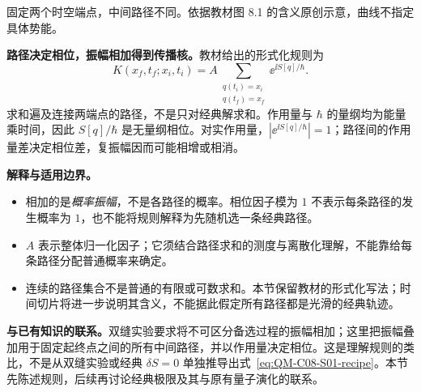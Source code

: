 \begin{center}
\begin{minipage}{\linewidth}
\centering
{}

\small 固定两个时空端点，中间路径不同。依据教材图 8.1 的含义原创示意，曲线不指定具体势能。
\end{minipage}
\end{center}

\textbf{路径决定相位，振幅相加得到传播核。}教材给出的形式化规则为
\begin{equation}
  \boxed{K(x_f,t_f;x_i,t_i)
     =A\sum_{\substack{q(t_i)=x_i\\q(t_f)=x_f}}
         \ee^{\ii S[q]/\hbar}}.
  \label{eq:QM-C08-S01-recipe}
\end{equation}
求和遍及连接两端点的路径，不是只对经典解求和。作用量与 $\hbar$ 的量纲均为能量乘时间，因此 $S[q]/\hbar$ 是无量纲相位。对实作用量，$|\ee^{\ii S[q]/\hbar}|=1$；路径间的作用量差决定相位差，复振幅因而可能相增或相消。

\textbf{解释与适用边界。}
\begin{itemize}
  \item 相加的是\emph{概率振幅}，不是各路径的概率。相位因子模为 $1$ 不表示每条路径的发生概率为 $1$，也不能将规则解释为先随机选一条经典路径。
  \item $A$ 表示整体归一化因子；它须结合路径求和的测度与离散化理解，不能靠给每条路径分配普通概率来确定。
  \item 连续的路径集合不是普通的有限或可数求和。本节保留教材的形式化写法；时间切片将进一步说明其含义，不能据此假定所有路径都是光滑的经典轨迹。
\end{itemize}

\textbf{与已有知识的联系。}双缝实验要求将不可区分备选过程的振幅相加；这里把振幅叠加用于固定起终点之间的所有中间路径，并以作用量决定相位。这是理解规则的类比，不是从双缝实验或经典 $\delta S=0$ 单独推导出式~\eqref{eq:QM-C08-S01-recipe}。本节先陈述规则，后续再讨论经典极限及其与原有量子演化的联系。

